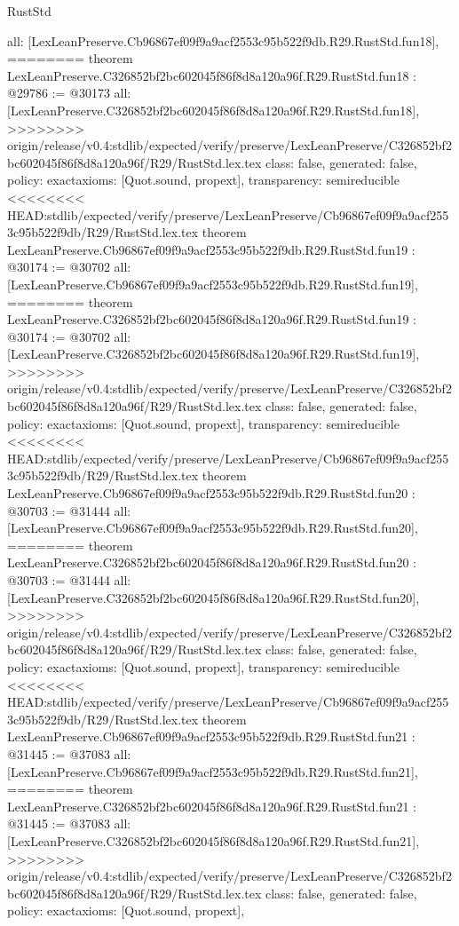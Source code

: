 \begin{lexlean}{RustStd}
\begin{coremodule}
{\begin{coremodule}
{{{{{{{{{{{{{{{{{{{{{  all: [LexLeanPreserve.Cb96867ef09f9a9acf2553c95b522f9db.R29.RustStd.fun18],
========
theorem LexLeanPreserve.C326852bf2bc602045f86f8d8a120a96f.R29.RustStd.fun18 : @29786 := @30173 {
  all: [LexLeanPreserve.C326852bf2bc602045f86f8d8a120a96f.R29.RustStd.fun18],
>>>>>>>> origin/release/v0.4:stdlib/expected/verify/preserve/LexLeanPreserve/C326852bf2bc602045f86f8d8a120a96f/R29/RustStd.lex.tex
  class: false,
  generated: false,
  policy: exact{axioms: [Quot.sound, propext]},
  transparency: semireducible
}
<<<<<<<< HEAD:stdlib/expected/verify/preserve/LexLeanPreserve/Cb96867ef09f9a9acf2553c95b522f9db/R29/RustStd.lex.tex
theorem LexLeanPreserve.Cb96867ef09f9a9acf2553c95b522f9db.R29.RustStd.fun19 : @30174 := @30702 {
  all: [LexLeanPreserve.Cb96867ef09f9a9acf2553c95b522f9db.R29.RustStd.fun19],
========
theorem LexLeanPreserve.C326852bf2bc602045f86f8d8a120a96f.R29.RustStd.fun19 : @30174 := @30702 {
  all: [LexLeanPreserve.C326852bf2bc602045f86f8d8a120a96f.R29.RustStd.fun19],
>>>>>>>> origin/release/v0.4:stdlib/expected/verify/preserve/LexLeanPreserve/C326852bf2bc602045f86f8d8a120a96f/R29/RustStd.lex.tex
  class: false,
  generated: false,
  policy: exact{axioms: [Quot.sound, propext]},
  transparency: semireducible
}
<<<<<<<< HEAD:stdlib/expected/verify/preserve/LexLeanPreserve/Cb96867ef09f9a9acf2553c95b522f9db/R29/RustStd.lex.tex
theorem LexLeanPreserve.Cb96867ef09f9a9acf2553c95b522f9db.R29.RustStd.fun20 : @30703 := @31444 {
  all: [LexLeanPreserve.Cb96867ef09f9a9acf2553c95b522f9db.R29.RustStd.fun20],
========
theorem LexLeanPreserve.C326852bf2bc602045f86f8d8a120a96f.R29.RustStd.fun20 : @30703 := @31444 {
  all: [LexLeanPreserve.C326852bf2bc602045f86f8d8a120a96f.R29.RustStd.fun20],
>>>>>>>> origin/release/v0.4:stdlib/expected/verify/preserve/LexLeanPreserve/C326852bf2bc602045f86f8d8a120a96f/R29/RustStd.lex.tex
  class: false,
  generated: false,
  policy: exact{axioms: [Quot.sound, propext]},
  transparency: semireducible
}
<<<<<<<< HEAD:stdlib/expected/verify/preserve/LexLeanPreserve/Cb96867ef09f9a9acf2553c95b522f9db/R29/RustStd.lex.tex
theorem LexLeanPreserve.Cb96867ef09f9a9acf2553c95b522f9db.R29.RustStd.fun21 : @31445 := @37083 {
  all: [LexLeanPreserve.Cb96867ef09f9a9acf2553c95b522f9db.R29.RustStd.fun21],
========
theorem LexLeanPreserve.C326852bf2bc602045f86f8d8a120a96f.R29.RustStd.fun21 : @31445 := @37083 {
  all: [LexLeanPreserve.C326852bf2bc602045f86f8d8a120a96f.R29.RustStd.fun21],
>>>>>>>> origin/release/v0.4:stdlib/expected/verify/preserve/LexLeanPreserve/C326852bf2bc602045f86f8d8a120a96f/R29/RustStd.lex.tex
  class: false,
  generated: false,
  policy: exact{axioms: [Quot.sound, propext]},
}}}}}}}}}}}}}}}}}}}}}}}}}
\end{coremodule}}
\end{coremodule}
\end{lexlean}
